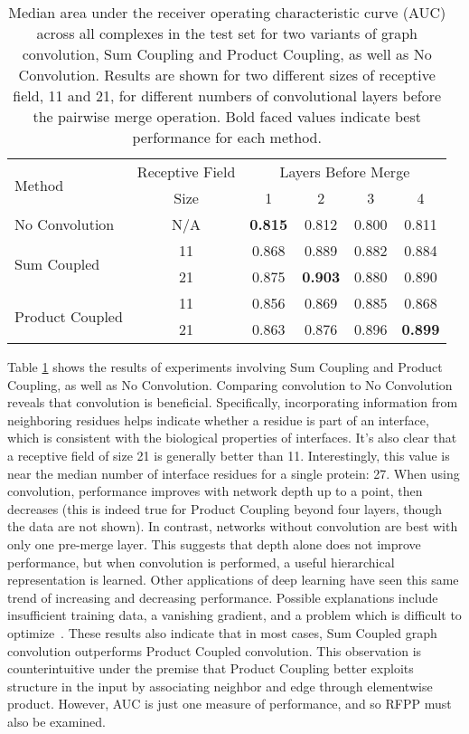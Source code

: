 \begin{table}
	\begin{center}
		\begin{tabular}{lccccc}
			\toprule
			\multirow{2}{*}{Method} &
			Receptive Field & \multicolumn{4}{c}{Layers Before Merge} \\
			& Size & 1 & {2} & {3} & {4} \\
			\midrule
			No Convolution & N/A & \textbf{0.815} & 0.812 & 0.800 & 0.811  \\\cline{1-6}
			\multirow{2}{*}{Sum Coupled} & 11 & 0.868 & 0.889 & 0.882 & 0.884 \\
			& 21 & 0.875 & \textbf{0.903} & 0.880 & 0.890 \\\cline{1-6}
			\multirow{2}{*}{Product Coupled} & 11 & 0.856 & 0.869 & 0.885 & 0.868 \\
			& 21 & 0.863 & 0.876 & 0.896 & \textbf{0.899} \\
			\bottomrule
		\end{tabular}
		\caption{Median area under the receiver operating characteristic curve (AUC) across all complexes in the test set for two variants of graph convolution, Sum Coupling and Product Coupling, as well as No Convolution. Results are shown for two different sizes of receptive field, 11 and 21, for different numbers of convolutional layers before the pairwise merge operation. Bold faced values indicate best performance for each method.
		\label{tab:med_auc}}
	\end{center}
\end{table}

Table \ref{tab:med_auc} shows the results of experiments involving Sum Coupling and Product Coupling, as well as No Convolution.
Comparing convolution to No Convolution reveals that convolution is beneficial.
Specifically, incorporating information from neighboring residues helps indicate whether a residue is part of an interface, which is consistent with the biological properties of interfaces.
It's also clear that a receptive field of size 21 is generally better than 11.
Interestingly, this value is near the median number of interface residues for a single protein: 27.
When using convolution, performance improves with network depth up to a point, then decreases (this is indeed true for Product Coupling beyond four layers, though the data are not shown).
In contrast, networks without convolution are best with only one pre-merge layer.
This suggests that depth alone does not improve performance, but when convolution is performed, a useful hierarchical representation is learned.
Other applications of deep learning have seen this same trend of increasing and decreasing performance.
Possible explanations include insufficient training data, a vanishing gradient, and a problem which is difficult to optimize~\cite{he2015}.
These results also indicate that in most cases, Sum Coupled graph convolution outperforms Product Coupled convolution.
This observation is counterintuitive under the premise that Product Coupling better exploits structure in the input by associating neighbor and edge through elementwise product.
However, AUC is just one measure of performance, and so RFPP must also be examined.

